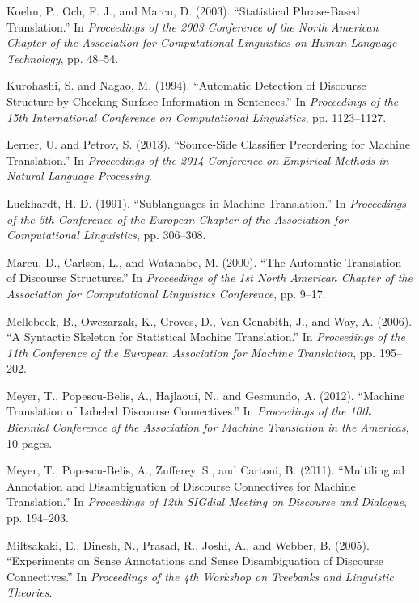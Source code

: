 \documentclass[japanese]{jnlp_1.4}
\begin{document}
\begin{thebibliography}{}
\item
Koehn, P., Och, F. J., and Marcu, D. (2003). ``Statistical Phrase-Based 
Translation.'' In \textit{Proceedings of the 2003 Conference of the North American Chapter of the Association for Computational Linguistics on Human Language Technology}, pp. 48--54.

\item
Kurohashi, S. and Nagao, M. (1994). ``Automatic Detection of Discourse 
Structure by Checking Surface Information in Sentences.'' In \textit{Proceedings of the 15th International Conference on Computational Linguistics}, pp. 
1123--1127.

\item
Lerner, U. and Petrov, S. (2013). ``Source-Side Classifier Preordering for 
Machine Translation.'' In \textit{Proceedings of the 2014 Conference on Empirical Methods in Natural Language Processing}.

\item
Luckhardt, H. D. (1991). ``Sublanguages in Machine Translation.'' In 
\textit{Proceedings of the 5th Conference of the European Chapter of the Association for Computational Linguistics}, pp. 306--308.

\item
Marcu, D., Carlson, L., and Watanabe, M. (2000). ``The Automatic Translation 
of Discourse Structures.'' In \textit{Proceedings of the 1st North American Chapter of the Association for Computational Linguistics Conference}, pp. 9--17.

\item
Mellebeek, B., Owczarzak, K., Groves, D., Van Genabith, J., and Way, A. 
(2006). ``A Syntactic Skeleton for Statistical Machine Translation.'' In 
\textit{Proceedings of the 11th Conference of the European Association for Machine Translation}, pp. 195--202.

\item
Meyer, T., Popescu-Belis, A., Hajlaoui, N., and Gesmundo, A. (2012). 
``Machine Translation of Labeled Discourse Connectives.'' In \textit{Proceedings of the 10th Biennial Conference of the Association for Machine Translation in the Americas}, 10 pages.

\item
Meyer, T., Popescu-Belis, A., Zufferey, S., and Cartoni, B. (2011). 
``Multilingual Annotation and Disambiguation of Discourse Connectives for 
Machine Translation.'' In \textit{Proceedings of 12th SIGdial Meeting on Discourse and Dialogue}, pp. 194--203.

\item
Miltsakaki, E., Dinesh, N., Prasad, R., Joshi, A., and Webber, B. (2005). 
``Experiments on Sense Annotations and Sense Disambiguation of Discourse 
Connectives.'' In \textit{Proceedings of the 4th Workshop on Treebanks and Linguistic Theories}.


\end{thebibliography}
\end{document}
